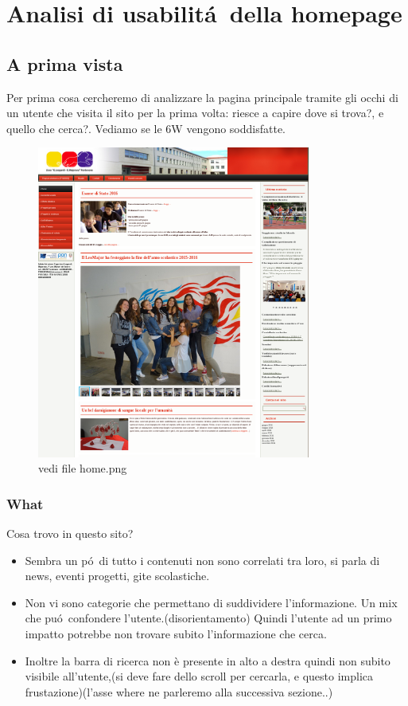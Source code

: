\documentclass[12pt]{article}
\begin{document}
\section{Analisi di usabilit\'a\ della homepage}
\subsection{A prima vista}
Per prima cosa cercheremo di analizzare la pagina principale tramite gli occhi di un utente che visita il sito per la prima volta: riesce a capire dove si trova?, e quello che cerca?. Vediamo se le 6W vengono soddisfatte.

\begin{figure}[ht!]
\centering
\includegraphics[width=90mm]{home}
\caption{vedi file home.png}
\end{figure} 

\newpage
\subsubsection{What} Cosa trovo in questo sito?
\begin{itemize}
	\item Sembra un p\'o\ di tutto i contenuti non sono correlati tra loro, si parla di news, eventi progetti, gite scolastiche. 

	\item Non vi sono categorie che permettano di suddividere l'informazione. Un mix che pu\'o\ confondere l'utente.(disorientamento) Quindi l'utente ad un primo impatto potrebbe non trovare subito l'informazione che cerca. 

	\item Inoltre la barra di ricerca non è presente in alto a destra quindi non subito visibile all'utente,(si deve fare dello scroll per cercarla, e questo implica frustazione)(l'asse where ne parleremo alla successiva sezione..)
\end{itemize}
\end{document}
